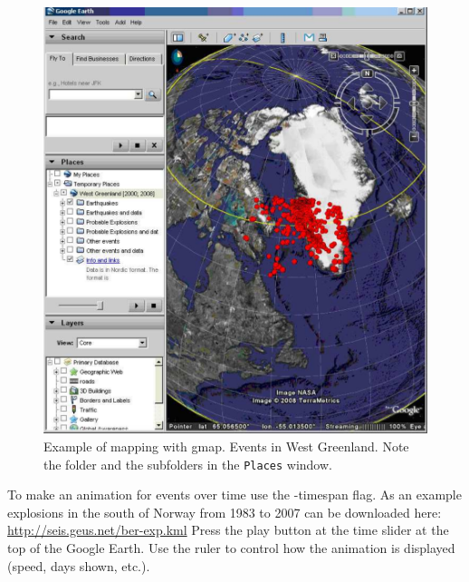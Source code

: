 \begin{figure}
\centerline{\includegraphics[width=0.9\linewidth]{fig/fig32}}
\caption{Example of mapping with gmap. Events in 
West Greenland. Note the folder and the subfolders in the \texttt{Places} window.}
\label{fig:gmap}
\end{figure}

To make an animation for events over time use the -timespan flag. As an example explosions in the south of Norway from 1983 to 2007 can be downloaded here: \url{http://seis.geus.net/ber-exp.kml} Press the play button at the time slider at the top of the Google Earth. Use the ruler to control how the animation is displayed (speed, days shown, etc.). 


